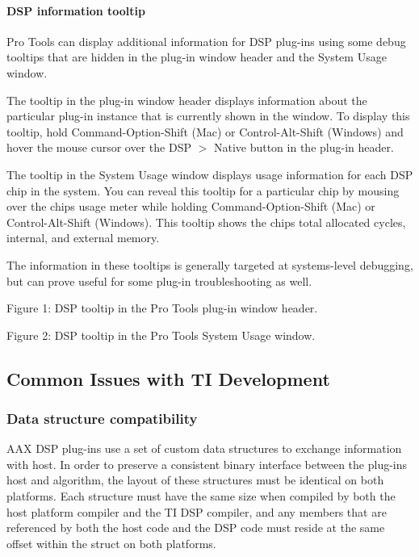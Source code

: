 \hypertarget{a00362_subsubsection__dsp_information_tooltip_}{}\paragraph{D\+S\+P information tooltip}\label{a00362_subsubsection__dsp_information_tooltip_}
 Pro Tools can display additional information for D\+S\+P plug-\/ins using some debug tooltips that are hidden in the plug-\/in window header and the System Usage window.

The tooltip in the plug-\/in window header displays information about the particular plug-\/in instance that is currently shown in the window. To display this tooltip, hold Command-\/\+Option-\/\+Shift (Mac) or Control-\/\+Alt-\/\+Shift (Windows) and hover the mouse cursor over the D\+S\+P $>$ Native button in the plug-\/in header.

The tooltip in the System Usage window displays usage information for each D\+S\+P chip in the system. You can reveal this tooltip for a particular chip by mousing over the chip\textquotesingle{}s usage meter while holding Command-\/\+Option-\/\+Shift (Mac) or Control-\/\+Alt-\/\+Shift (Windows). This tooltip shows the chip\textquotesingle{}s total allocated cycles, internal, and external memory.

The information in these tooltips is generally targeted at systems-\/level debugging, but can prove useful for some plug-\/in troubleshooting as well.

  Figure 1\+: D\+S\+P tooltip in the Pro Tools plug-\/in window header. 

  Figure 2\+: D\+S\+P tooltip in the Pro Tools System Usage window. 



 \hypertarget{a00362_aax_ti_guide_05_common_issues_with_ti_development}{}\subsection{Common Issues with T\+I Development}\label{a00362_aax_ti_guide_05_common_issues_with_ti_development}
 \hypertarget{a00362_subsection__data_structure_compatibility}{}\subsubsection{Data structure compatibility}\label{a00362_subsection__data_structure_compatibility}
A\+A\+X D\+S\+P plug-\/ins use a set of custom data structures to exchange information with host. In order to preserve a consistent binary interface between the plug-\/in\textquotesingle{}s host and algorithm, the layout of these structures must be identical on both platforms. Each structure must have the same size when compiled by both the host platform compiler and the T\+I D\+S\+P compiler, and any members that are referenced by both the host code and the D\+S\+P code must reside at the same offset within the struct on both platforms.


